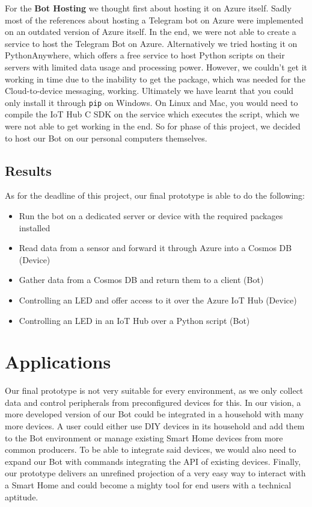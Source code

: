 \documentclass[a4paper]{article}
\begin{document}
	 	For the \textbf{Bot Hosting} we thought first about hosting it on Azure itself.
	 	Sadly most of the references about hosting a Telegram bot on Azure were implemented on an outdated version of Azure itself.
	 	In the end, we were not able to create a service to host the Telegram Bot on Azure.
	 	Alternatively we tried hosting it on PythonAnywhere, which offers a free service to host Python scripts on their servers with limited data usage and processing power.
	 	However, we couldn't get it working in time due to the inability to get the package, which was needed for the Cloud-to-device messaging, working.
	 	Ultimately we have learnt that you could only install it through \texttt{pip} on Windows. 
	 	On Linux and Mac, you would need to compile the IoT Hub C SDK on the service which executes the script, which we were not able to get working in the end.
	 	So for phase of this project, we decided to host our Bot on our personal computers themselves.
	 		
	 	\newpage	
	 		
		\subsection{Results}
		
		As for the deadline of this project, our final prototype is able to do the following:
		
		\begin{itemize}
			\item Run the bot on a dedicated server or device with the required packages installed
			\item Read data from a sensor and forward it through Azure into a Cosmos DB (Device)
			\item Gather data from a Cosmos DB and return them to a client (Bot)
			\item Controlling an LED and offer access to it over the Azure IoT Hub (Device)
			\item Controlling an LED in an IoT Hub over a Python script (Bot)
		\end{itemize}
		
	\section{Applications}
	
	Our final prototype is not very suitable for every environment, as we only collect data and control peripherals from preconfigured devices for this.
	In our vision, a more developed version of our Bot could be integrated in a household with many more devices.
	A user could either use DIY devices in its household and add them to the Bot environment or manage existing Smart Home devices from more common producers.
	To be able to integrate said devices, we would also need to expand our Bot with commands integrating the API of existing devices.
	Finally, our prototype delivers an unrefined projection of a very easy way to interact with a Smart Home and could become a mighty tool for end users with a technical aptitude.
	
\end{document}

